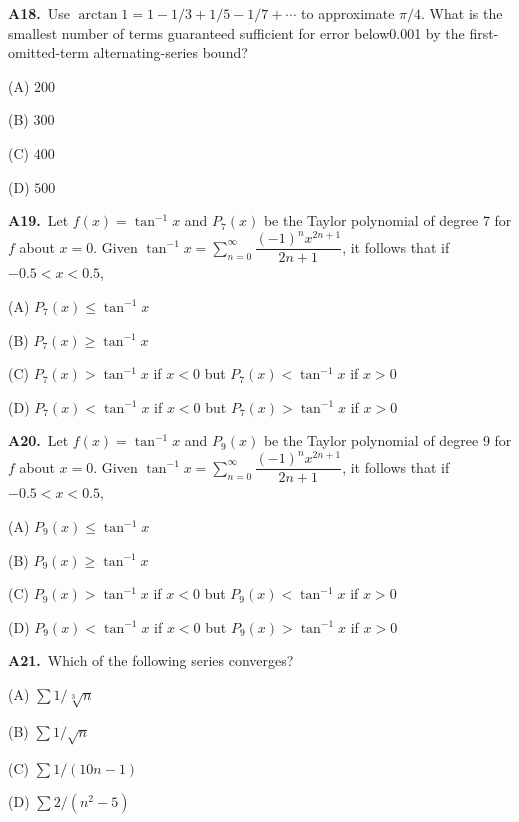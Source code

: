 \documentclass[11pt]{article}
\begin{document}
\bigskip\noindent\textbf{A18.}\ Use $\arctan1=1-1/3+1/5-1/7+\cdots$ to approximate $\pi/4$. What is the smallest number of terms guaranteed sufficient for error below0.001 by the first-omitted-term alternating-series bound?
\begin{list}{}{\setlength{\leftmargin}{3em}\setlength{\labelwidth}{2.5em}\setlength{\itemsep}{0pt}\setlength{\topsep}{2pt}}
\item[(A)] $200$
\item[(B)] $300$
\item[(C)] $400$
\item[(D)] $500$
\end{list}

\bigskip\noindent\textbf{A19.}\ Let $f(x)=\tan^{-1}x$ and $P_7(x)$ be the Taylor polynomial of degree 7 for $f$ about $x=0$. Given $\tan^{-1}x = \displaystyle\sum_{n=0}^\infty \dfrac{(-1)^n x^{2n+1}}{2n+1}$, it follows that if $-0.5<x<0.5$,
\begin{list}{}{\setlength{\leftmargin}{3em}\setlength{\labelwidth}{2.5em}\setlength{\itemsep}{0pt}\setlength{\topsep}{2pt}}
\item[(A)] $P_7(x)\leq \tan^{-1}x$
\item[(B)] $P_7(x)\geq \tan^{-1}x$
\item[(C)] $P_7(x)>\tan^{-1}x$ if $x<0$ but $P_7(x)<\tan^{-1}x$ if $x>0$
\item[(D)] $P_7(x)<\tan^{-1}x$ if $x<0$ but $P_7(x)>\tan^{-1}x$ if $x>0$
\end{list}

\bigskip\noindent\textbf{A20.}\ Let $f(x)=\tan^{-1}x$ and $P_{9}(x)$ be the Taylor polynomial of degree 9 for $f$ about $x=0$. Given $\tan^{-1}x = \displaystyle\sum_{n=0}^\infty \dfrac{(-1)^n x^{2n+1}}{2n+1}$, it follows that if $-0.5<x<0.5$,
\begin{list}{}{\setlength{\leftmargin}{3em}\setlength{\labelwidth}{2.5em}\setlength{\itemsep}{0pt}\setlength{\topsep}{2pt}}
\item[(A)] $P_{9}(x)\leq \tan^{-1}x$
\item[(B)] $P_{9}(x)\geq \tan^{-1}x$
\item[(C)] $P_{9}(x)>\tan^{-1}x$ if $x<0$ but $P_{9}(x)<\tan^{-1}x$ if $x>0$
\item[(D)] $P_{9}(x)<\tan^{-1}x$ if $x<0$ but $P_{9}(x)>\tan^{-1}x$ if $x>0$
\end{list}

\bigskip\noindent\textbf{A21.}\ Which of the following series converges?
\begin{list}{}{\setlength{\leftmargin}{3em}\setlength{\labelwidth}{2.5em}\setlength{\itemsep}{0pt}\setlength{\topsep}{2pt}}
\item[(A)] $\sum1/\sqrt[3]n$
\item[(B)] $\sum1/\sqrt n$
\item[(C)] $\sum1/(10n-1)$
\item[(D)] $\sum2/(n^2-5)$
\end{list}
\end{document}
